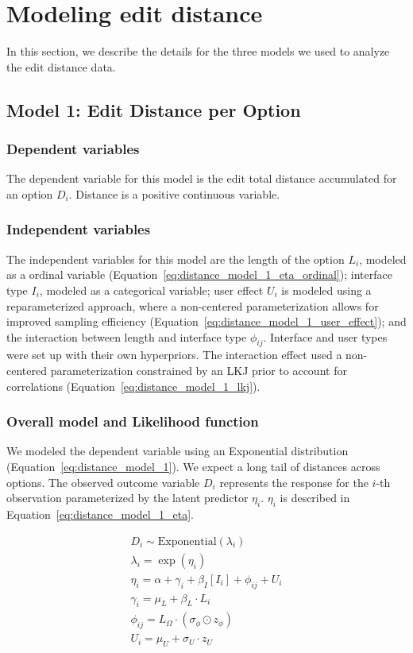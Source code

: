 \section{Modeling edit distance} \label{sec:apdx:model_distance}
In this section, we describe the details for the three models we used to analyze the edit distance data.

\subsection{Model 1: Edit Distance per Option} \label{sec:apdx:model_distance_option}

\subsubsection{Dependent variables}
The dependent variable for this model is the edit total distance accumulated for an option $D_i$. Distance is a positive continuous variable.

\subsubsection{Independent variables}
The independent variables for this model are the length of the option $L_i$, modeled as a ordinal variable (Equation~\ref{eq:distance_model_1_eta_ordinal}); interface type $I_i$, modeled as a categorical variable; user effect $U_i$ is modeled using a reparameterized approach, where a non-centered parameterization allows for improved sampling efficiency (Equation~\ref{eq:distance_model_1_user_effect}); and the interaction between length and interface type $\phi_{ij}$. Interface and user types were set up with their own hyperpriors. The interaction effect used a non-centered parameterization constrained by an LKJ prior to account for correlations (Equation~\ref{eq:distance_model_1_lkj}). 

\subsubsection{Overall model and Likelihood function}
We modeled the dependent variable using an Exponential distribution (Equation~\ref{eq:distance_model_1}). We expect a long tail of distances across options. The observed outcome variable $D_i$ represents the response for the $i$-th observation parameterized by the latent predictor $\eta_i$. $\eta_i$ is described in Equation~\ref{eq:distance_model_1_eta}.

\begin{align}
    D_i \sim \text{Exponential}(\lambda_i) \label{eq:distance_model_1} \\
    \lambda_i = \exp(\eta_i)\\
    \eta_i = \alpha + \gamma_i + \beta_I[I_i] + \phi_{ij} + U_i \label{eq:distance_model_1_eta} \\
    \gamma_i = \mu_L + \beta_L \cdot L_i \label{eq:distance_model_1_eta_ordinal} \\
    \phi_{ij} = L_{\Omega} \cdot (\sigma_{\phi} \odot z_{\phi}) \label{eq:distance_model_1_lkj} \\
    U_i = \mu_U + \sigma_U \cdot z_U \label{eq:distance_model_1_user_effect}
\end{align}

